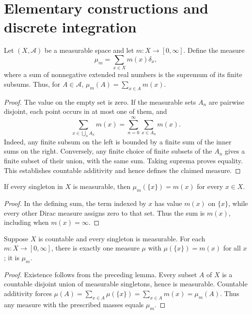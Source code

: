 \section{Elementary constructions and discrete integration}

\begin{definition}
\label{def:singleton-measure}
\leanok
{}
Let $(X,\mathcal A)$ be a measurable space and let
$m:X\to[0,\infty]$. Define the measure
\[
 \mu_m=\sum_{x\in X}m(x)\delta_x,
\]
where a sum of nonnegative extended real numbers is the supremum of
its finite subsums. Thus, for $A\in\mathcal A$,
$\mu_m(A)=\sum_{x\in A}m(x)$.
\end{definition}
\begin{proof}
The value on the empty set is zero. If the measurable sets $A_n$ are
pairwise disjoint, each point occurs in at most one of them, and
\[
 \sum_{x\in\bigcup_n A_n}m(x)
 =\sum_{n=0}^{\infty}\sum_{x\in A_n}m(x).
\]
Indeed, any finite subsum on the left is bounded by a finite sum of
the inner sums on the right. Conversely, any finite choice of finite
subsets of the $A_n$ gives a finite subset of their union, with the
same sum. Taking suprema proves equality. This establishes countable
additivity and hence defines the claimed measure.
\end{proof}

\begin{lemma}
\label{lem:singleton-measure-values}
\leanok
{}
If every singleton in $X$ is measurable, then
$\mu_m(\{x\})=m(x)$ for every $x\in X$.
\end{lemma}
\begin{proof}
In the defining sum, the term indexed by $x$ has value $m(x)$ on
$\{x\}$, while every other Dirac measure assigns zero to that set.
Thus the sum is $m(x)$, including when $m(x)=\infty$.
\end{proof}

\begin{proposition}
\label{prop:countable-singleton-measure}
\leanok
{}
Suppose $X$ is countable and every singleton is measurable. For each
$m:X\to[0,\infty]$, there is exactly one measure $\mu$ with
$\mu(\{x\})=m(x)$ for all $x$; it is $\mu_m$.
\end{proposition}
\begin{proof}
Existence follows from the preceding lemma. Every subset $A$ of $X$
is a countable disjoint union of measurable singletons, hence is
measurable. Countable additivity forces
$\mu(A)=\sum_{x\in A}\mu(\{x\})=\sum_{x\in A}m(x)=\mu_m(A)$.
Thus any measure with the prescribed masses equals $\mu_m$.
\end{proof}

